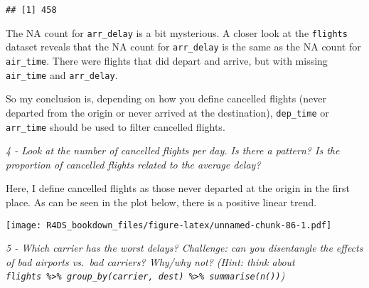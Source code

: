 \documentclass[]{article}
\newenvironment{Shaded}{\begin{snugshade}}{\end{snugshade}}
\newcommand{\KeywordTok}[1]{\textcolor[rgb]{0.13,0.29,0.53}{\textbf{#1}}}
\newcommand{\DataTypeTok}[1]{\textcolor[rgb]{0.13,0.29,0.53}{#1}}
\newcommand{\StringTok}[1]{\textcolor[rgb]{0.31,0.60,0.02}{#1}}
\newcommand{\OtherTok}[1]{\textcolor[rgb]{0.56,0.35,0.01}{#1}}
\newcommand{\OperatorTok}[1]{\textcolor[rgb]{0.81,0.36,0.00}{\textbf{#1}}}
\newcommand{\NormalTok}[1]{#1}
\theoremstyle{definition}
\theoremstyle{definition}
\theoremstyle{definition}
\theoremstyle{remark}
\begin{document}
\begin{verbatim}
## [1] 458
\end{verbatim}

The NA count for \texttt{arr\_delay} is a bit mysterious. A closer look
at the \texttt{flights} dataset reveals that the NA count for
\texttt{arr\_delay} is the same as the NA count for \texttt{air\_time}.
There were flights that did depart and arrive, but with missing
\texttt{air\_time} and \texttt{arr\_delay}.

So my conclusion is, depending on how you define cancelled flights
(never departed from the origin or never arrived at the destination),
\texttt{dep\_time} or \texttt{arr\_time} should be used to filter
cancelled flights.

\emph{4 - Look at the number of cancelled flights per day. Is there a
pattern? Is the proportion of cancelled flights related to the average
delay?}

Here, I define cancelled flights as those never departed at the origin
in the first place. As can be seen in the plot below, there is a
positive linear trend.

\begin{Shaded}
\end{Shaded}

\texttt{[image: R4DS\_bookdown\_files/figure-latex/unnamed-chunk-86-1.pdf]}

\emph{5 - Which carrier has the worst delays? Challenge: can you
disentangle the effects of bad airports vs.~bad carriers? Why/why not?
(Hint: think about
\texttt{flights\ \%\textgreater{}\%\ group\_by(carrier,\ dest)\ \%\textgreater{}\%\ summarise(n())})}
\end{document}
